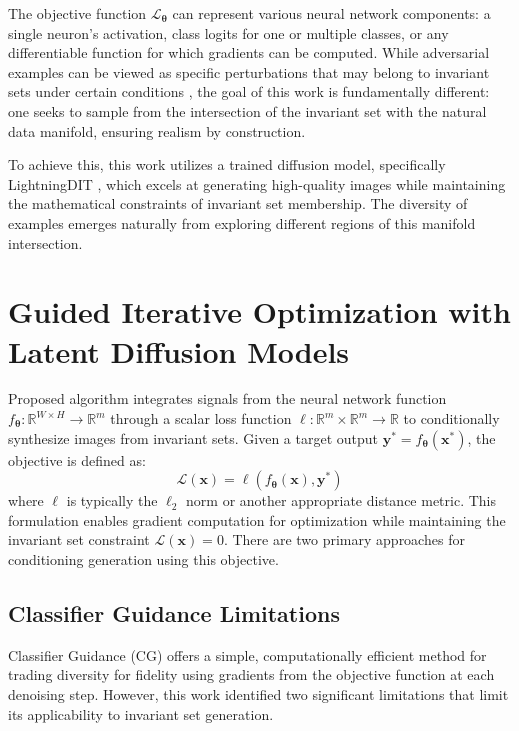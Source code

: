 The objective function $\mathcal{L}_{\boldsymbol{\theta}}$ can represent various neural network components: a single neuron's activation, class logits for one or multiple classes, or any differentiable function for which gradients can be computed. While adversarial examples can be viewed as specific perturbations that may belong to invariant sets under certain conditions \citep{szegedy2014intriguingpropertiesneuralnetworks}, the goal of this work is fundamentally different: one seeks to sample from the intersection of the invariant set with the natural data manifold, ensuring realism by construction.

To achieve this, this work utilizes a trained diffusion model, specifically LightningDIT \citep{yao2025vavae} \citep{yao2024fasterdit}, which excels at generating high-quality images while maintaining the mathematical constraints of invariant set membership. The diversity of examples emerges naturally from exploring different regions of this manifold intersection.


\section{Guided Iterative Optimization with Latent Diffusion Models}

Proposed algorithm integrates signals from the neural network function $f_{\boldsymbol{\theta}}:\mathbb{R}^{W \times H} \rightarrow \mathbb{R}^m$ through a scalar loss function $\ell: \mathbb{R}^m \times \mathbb{R}^m \rightarrow \mathbb{R}$ to conditionally synthesize images from invariant sets. Given a target output $\mathbf{y^*} = f_{\boldsymbol{\theta}}(\mathbf{x^*})$, the objective is defined as:
\begin{equation}
\mathcal{L}(\mathbf{x}) = \ell(f_{\boldsymbol{\theta}}(\mathbf{x}), \mathbf{y^*})
\end{equation}
where $\ell$ is typically the $\ell_2$ norm or another appropriate distance metric. This formulation enables gradient computation for optimization while maintaining the invariant set constraint $\mathcal{L}(\mathbf{x}) = 0$. There are two primary approaches for conditioning generation using this objective.

\subsection{Classifier Guidance Limitations}

Classifier Guidance (CG) \citep{dhariwal2021diffusionmodelsbeatgans} offers a simple, computationally efficient method for trading diversity for fidelity using gradients from the objective function at each denoising step. However, this work identified two significant limitations that limit its applicability to invariant set generation.

